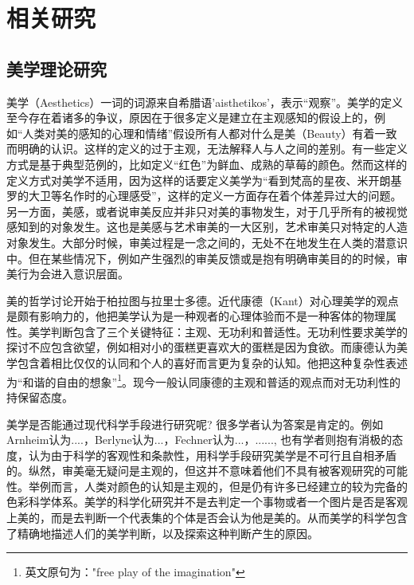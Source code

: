 \chapter{相关研究}
\label{chap:related}

\section{美学理论研究}
美学（Aesthetics）一词的词源来自希腊语'aisthetikos'，表示“观察”。美学的定义至今存在着诸多的争议，原因在于很多定义是建立在主观感知的假设上的，例如“人类对美的感知的心理和情绪”假设所有人都对什么是美（Beauty）有着一致而明确的认识。这样的定义的过于主观，无法解释人与人之间的差别。有一些定义方式是基于典型范例的，比如定义“红色”为鲜血、成熟的草莓的颜色。然而这样的定义方式对美学不适用，因为这样的话要定义美学为“看到梵高的星夜、米开朗基罗的大卫等名作时的心理感受”，这样的定义一方面存在着个体差异过大的问题。另一方面，美感，或者说审美反应并非只对美的事物发生，对于几乎所有的被视觉感知到的对象发生。这也是美感与艺术审美的一大区别，艺术审美只对特定的人造对象发生。大部分时候，审美过程是一念之间的，无处不在地发生在人类的潜意识中。但在某些情况下，例如产生强烈的审美反馈或是抱有明确审美目的的时候，审美行为会进入意识层面。

美的哲学讨论开始于柏拉图与拉里士多德。近代康德（Kant）对心理美学的观点是颇有影响力的，他把美学认为是一种观者的心理体验而不是一种客体的物理属性。美学判断包含了三个关键特征：主观、无功利和普适性。无功利性要求美学的探讨不应包含欲望，例如相对小的蛋糕更喜欢大的蛋糕是因为食欲。而康德认为美学包含着相比仅仅的认同和个人的喜好而言更为复杂的认知。他把这种复杂性表述为“和谐的自由的想象”\footnote{英文原句为："free play of the imagination"}。现今一般认同康德的主观和普适的观点而对无功利性的持保留态度。

美学是否能通过现代科学手段进行研究呢? 很多学者认为答案是肯定的。例如Arnheim认为....，Berlyne认为...，Fechner认为...，......, 也有学者则抱有消极的态度，认为由于科学的客观性和条款性，用科学手段研究美学是不可行且自相矛盾的。纵然，审美毫无疑问是主观的，但这并不意味着他们不具有被客观研究的可能性。举例而言，人类对颜色的认知是主观的，但是仍有许多已经建立的较为完备的色彩科学体系。美学的科学化研究并不是去判定一个事物或者一个图片是否是客观上美的，而是去判断一个代表集的个体是否会认为他是美的。从而美学的科学包含了精确地描述人们的美学判断，以及探索这种判断产生的原因。

